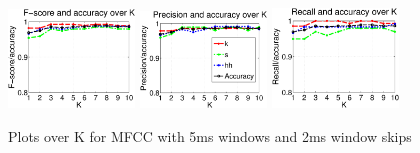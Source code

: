 \begin{figure}


	\centering\includegraphics[width=0.3\textwidth]{tex/appendices/test/mfcc52FP.png}
	\centering\includegraphics[width=0.3\textwidth]{tex/appendices/test/mfcc52_P.png}
	\centering\includegraphics[width=0.3\textwidth]{tex/appendices/test/mfcc52_R.png}
	
	\caption{Plots over K for MFCC with 5ms windows and 2ms window skips}
\end{figure}\clearpage


